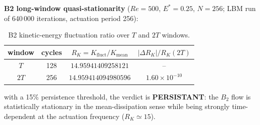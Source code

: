 \documentclass[11pt]{article}
\begin{document}
\textbf{B2 long-window quasi-stationarity} ($Re=500$, $E^*=0.25$, $N=256$;
LBM run of 640\,000 iterations, actuation period 256):

\begin{table}[h]
\centering\small
\caption{B2 kinetic-energy fluctuation ratio over $T$ and $2T$ windows.}
\label{tab:S11c}
\begin{tabular}{cccc}
\toprule
window & cycles & $R_K=K_{\mathrm{fluct}}/K_{\mathrm{mean}}$ & $|\Delta R_K|/R_K(2T)$\\
\midrule
$T$ & 128 & $14.95941409258121$ & --\\
$2T$ & 256 & $14.959414094980596$ & $1.60\times10^{-10}$\\
\bottomrule
\end{tabular}
\end{table}

with a 15\% persistence threshold, the verdict is \textbf{PERSISTANT}: the $B_2$
flow is statistically stationary in the mean-dissipation sense while being
strongly time-dependent at the actuation frequency ($R_K\simeq15$).
\end{document}
